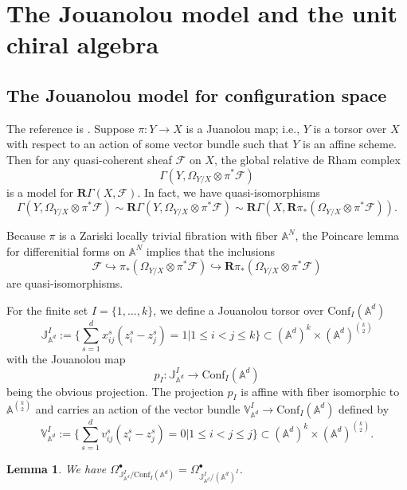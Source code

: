 \documentclass[11pt]{amsart}
\newtheorem{lem}[thm]{Lemma}
\theoremstyle{definition}
\theoremstyle{remark}
\numberwithin{equation}{section}
\newcommand{\R}{\mathbf{R}}
\begin{document}
\section{The Jouanolou model and the unit chiral algebra}

\subsection{The Jouanolou model for configuration space}
The reference is \cite[Section 4.1.3, pp279]{beilinson2004chiral}. Suppose $\pi:Y\rightarrow X$ is a Juanolou map; i.e., $Y$ is a torsor over $X$ with respect to an action of some vector bundle such that $Y$ is an affine scheme. Then for any quasi-coherent sheaf $\mathcal{F}$ on $X$, the global relative de Rham complex
$$
\Gamma(Y,\Omega_{Y/X}\otimes\pi^*\mathcal{F})
$$
is a model for $\R\Gamma(X,\mathcal{F})$. In fact, we have quasi-isomorphisms
$$
\Gamma(Y,\Omega_{Y/X}\otimes\pi^*\mathcal{F})\sim \R\Gamma(Y,\Omega_{Y/X}\otimes\pi^*\mathcal{F})\sim \R\Gamma(X,\R\pi_*(\Omega_{Y/X}\otimes\pi^*\mathcal{F})).
$$




Because $\pi$ is a Zariski locally trivial fibration with fiber $\mathbb{A}^N$, the Poincare lemma for differenitial
forms on $\mathbb{A}^N$ implies that the inclusions
$$
\mathcal{F}\hookrightarrow \pi_*(\Omega_{Y/X}\otimes\pi^*\mathcal{F})\hookrightarrow \R\pi_*(\Omega_{Y/X}\otimes\pi^*\mathcal{F})
$$
are quasi-isomorphisms.

For the finite set $I = \{1,\ldots,k\}$, we define a Jouanolou torsor over $\mathrm{Conf}_{{I}}(\mathbb{A}^d)$
$$
\mathbb{J}_{\mathbb{A}^d}^{{I}}:=\{\sum_{s=1}^d x_{ij}^s(z^s_i-z^s_j)=1|1\leq i<j\leq k \}\subset (\mathbb{A}^d)^{k}\times (\mathbb{A}^d)^{\binom{k}{2}}
$$
with the Jouanolou map
\[
p_{{I}}\colon\mathbb{J}_{\mathbb{A}^d}^{{I}}\rightarrow \mathrm{Conf}_{{I}}(\mathbb{A}^d)
\]
being the obvious projection.
The projection $p_{{I}}$ is affine with fiber isomorphic to $\mathbb{A}^{\binom{k}{2}}$ and carries an action of the vector bundle $\mathbb{V}_{\mathbb{A}^d}^{{I}}\rightarrow \mathrm{Conf}_{{I}}(\mathbb{A}^d)$ defined by
$$
\mathbb{V}_{\mathbb{A}^d}^{{I}}:=\{\sum_{s=1}^d v_{ij}^s(z^s_i-z^s_j)=0|1\leq i<j\leq j\}\subset (\mathbb{A}^d)^{k}\times (\mathbb{A}^d)^{\binom{k}{2}}.
$$
\begin{lem}
    We have $\Omega^{\bullet}_{\mathbb{J}_{\mathbb{A}^d}^{{I}}/\mathrm{Conf}_{{I}}(\mathbb{A}^d)}=\Omega^{\bullet}_{\mathbb{J}_{\mathbb{A}^d}^{{I}}/(\mathbb{A}^d)^{{I}}}$.
\end{lem}
\end{document}
